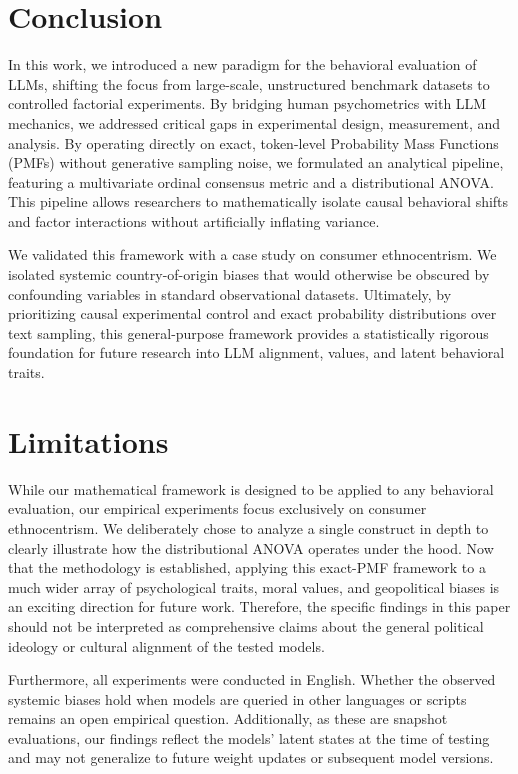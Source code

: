 \section{Conclusion}

In this work, we introduced a new paradigm for the behavioral evaluation of LLMs, shifting the focus from large-scale, unstructured benchmark datasets to controlled factorial experiments. 
By bridging human psychometrics with LLM mechanics, we addressed critical gaps in experimental design, measurement, and analysis. 
By operating directly on exact, token-level Probability Mass Functions (PMFs) without generative sampling noise, we formulated an analytical pipeline, featuring a multivariate ordinal consensus metric and a distributional ANOVA. This pipeline allows researchers to mathematically isolate causal behavioral shifts and factor interactions without artificially inflating variance.

We validated this framework with a case study on consumer ethnocentrism. 
We isolated systemic country-of-origin biases that would otherwise be obscured by confounding variables in standard observational datasets. 
Ultimately, by prioritizing causal experimental control and exact probability distributions over text sampling, this general-purpose framework provides a statistically rigorous foundation for future research into LLM alignment, values, and latent behavioral traits.


\section*{Limitations}

While our mathematical framework is designed to be applied to any behavioral evaluation, our empirical experiments focus exclusively on consumer ethnocentrism. We deliberately chose to analyze a single construct in depth to clearly illustrate how the distributional ANOVA operates under the hood. Now that the methodology is established, applying this exact-PMF framework to a much wider array of psychological traits, moral values, and geopolitical biases is an exciting direction for future work. Therefore, the specific findings in this paper should not be interpreted as comprehensive claims about the general political ideology or cultural alignment of the tested models.

Furthermore, all experiments were conducted in English. 
Whether the observed systemic biases hold when models are queried in other languages or scripts remains an open empirical question. 
Additionally, as these are snapshot evaluations, our findings reflect the models' latent states at the time of testing and may not generalize to future weight updates or subsequent model versions.

